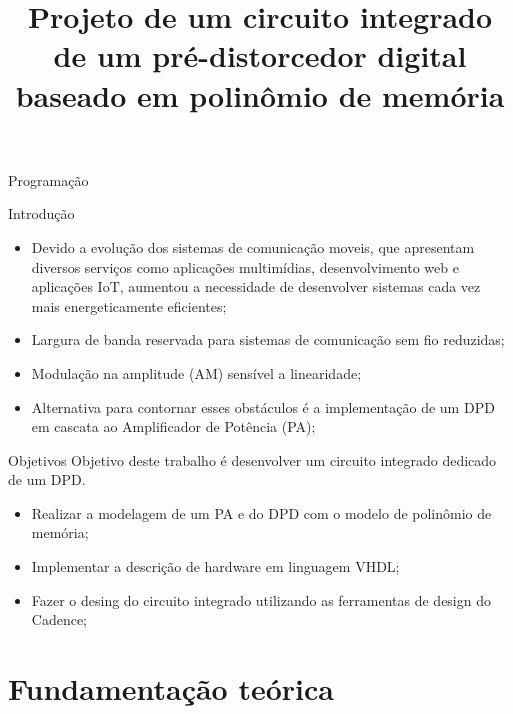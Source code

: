 \documentclass{if-beamer}
\title[Pré-distorcedor digital baseado em polinômio de memória]{\textbf{Projeto de um circuito integrado de um pré-distorcedor digital baseado em polinômio de memória}}
\subtitle{}
\author[Leonardo de Andrade Santos]{\large \negrito{Leonardo de Andrade Santos}}
\institute[UFPR/PR]{
    \small \textit{Universidade Federal do Paraná} \\
}
\date{\the\year}
\begin{document}
\begin{frame}
  \titlepage
\end{frame}

\begin{frame}{Programação}
  \tableofcontents
\end{frame}

\begin{frame}{Introdução}
\begin{itemize}
	\item Devido a evolução dos sistemas de comunicação moveis, que apresentam diversos serviços como aplicações multimídias, desenvolvimento web e aplicações IoT, aumentou a necessidade de desenvolver sistemas cada vez mais energeticamente eficientes;
	\item Largura de banda reservada para sistemas de comunicação sem fio reduzidas;
	\item Modulação na amplitude (AM) sensível a linearidade;
	\item Alternativa para contornar esses obstáculos é a implementação de um DPD em cascata ao Amplificador de Potência (PA);
\end{itemize}
\end{frame}

\begin{frame}{Objetivos}
	Objetivo deste trabalho é desenvolver um circuito integrado dedicado de um DPD.
	\begin{itemize}
		\item Realizar a modelagem de um PA e do DPD com o modelo de polinômio de memória;
		\item Implementar a descrição de hardware em 
		linguagem VHDL;
		\item Fazer o desing do circuito integrado utilizando as ferramentas de design do Cadence;
	\end{itemize}
\end{frame}



\section{Fundamentação teórica}

\end{document}
